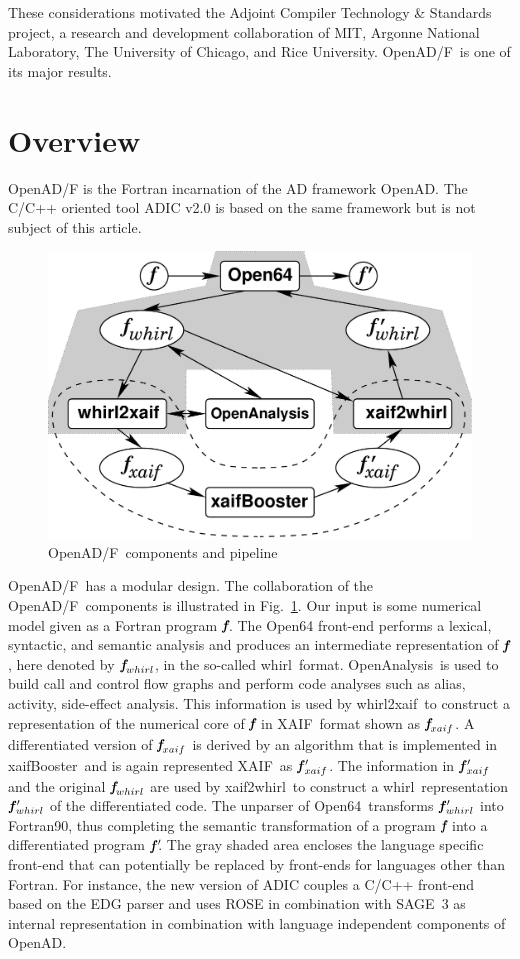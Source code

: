 \documentclass{book}
\newcommand{\OpenADF}{OpenAD/F}
\newcommand{\OpenAD}{OpenAD}
\newcommand{\OpenAnalysis}{OpenAnalysis}
\newcommand{\OpenSixtyFour}{Open64}
\newcommand{\xaif}{XAIF}
\newcommand{\xaifBooster}{xaifBooster}
\newcommand{\whirl}{whirl}
\newcommand{\whirlToxaif}{whirl2xaif}
\newcommand{\xaifTowhirl}{xaif2whirl}
\newcommand{\bmf}{\mbox{\bf\em f}}
\newcommand{\bmfp}{\mbox{\bf\em f$\,^\prime\!\!$}}
\newcommand{\reffig}[1]{{Fig.~\ref{#1}}}
\begin{document}
These considerations motivated the 
Adjoint Compiler Technology \& Standards \cite{actsWeb} project, a research and 
development collaboration of MIT, Argonne National Laboratory, 
The University of Chicago, and Rice University. \OpenADF\ is one of its major results.

\section{Overview} \label{sec:overview}
\OpenADF \cite{openadWeb}
is the Fortran incarnation of the AD framework \OpenAD.
The C/C++ oriented tool ADIC v2.0 \cite{adicWeb}
is based on the same framework but is 
not subject of this article.
\begin{figure}
  \centering\includegraphics[width=.5\textwidth]{overview}
  \caption{\OpenADF\ components and pipeline} \label{fig:overview}
\end{figure}
\OpenADF\ has  a modular design. 
The collaboration  of the \OpenADF\ components is illustrated in 
\reffig{fig:overview}.
Our input is some numerical model given as a Fortran program 
$\bmf$.
The \OpenSixtyFour\cite{open64Web}
front-end performs a lexical, 
syntactic, and semantic analysis and produces an 
intermediate representation of $\bmf$, here denoted by $\bmf_{\whirl}$, 
in the so-called \whirl\ format.
\OpenAnalysis\ is used to build call and control flow graphs and  perform 
code analyses such as alias, activity, side-effect analysis.
This information is used by 
\whirlToxaif\ to construct a representation of the numerical core of $\bmf$ in
\xaif\ format shown as $\bmf_{xaif}$.  
A differentiated version of $\bmf_{xaif}$ is derived by an 
algorithm that is implemented in \xaifBooster\ and is again represented 
\xaif\ as $\bmfp_{xaif}$.
The information in $\bmfp_{xaif}$ and the original $\bmf_{\whirl}$ are used by 
\xaifTowhirl\ to construct a 
\whirl\ representation $\bmfp_{\whirl}$ of the differentiated code. 
The unparser of 
\OpenSixtyFour\ transforms $\bmfp_{\whirl}$ into Fortran90, thus completing
the semantic transformation of a program $\bmf$ into
a differentiated program $\bmfp$.
The gray shaded area encloses the language specific front-end that can potentially
be replaced by front-ends for languages other than Fortran. 
For instance, the new version of ADIC \cite{HoNo01} couples a C/C++ 
front-end 
based on the EDG parser \cite{edgWeb} and uses ROSE in combination with SAGE~3 \cite{roseWeb} 
as internal representation in combination with language independent components of \OpenAD.
\end{document}
